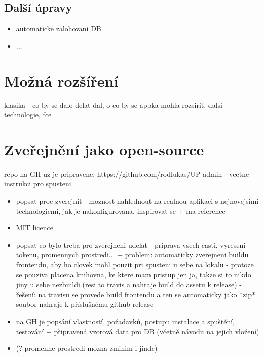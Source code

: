 \section{Další úpravy}
\begin{itemize}
\item automaticke zalohovani DB
\item ...
\end{itemize}



\chapter{Možná rozšíření}
klasika - co by se dalo delat dal, o co by se appka mohla rozsirit, dalsi technologie, fce

\chapter{Zveřejnění jako open-source}
repo na GH uz je pripravene: https://github.com/rodlukas/UP-admin - vcetne instrukci pro spusteni
\begin{itemize}
\item popsat proc zverejnit - moznost nahlednout na realnou aplikaci s nejnovejsimi technologiemi, jak je nakonfigurovana, inspirovat se + ma reference
\item MIT licence
\item popsat co bylo treba pro zverejneni udelat - priprava vsech casti, vyreseni tokenu, promennych prostredi... + problem: automaticky zverejneni buildu frontendu, aby ho clovek mohl pouzit pri spusteni u sebe na lokalu - protoze se pouziva placena knihovna, ke ktere mam pristup jen ja, takze si to nikdo jiny u sebe nezbuildi (resi to travis a nahraje build do assetu k release) - řešení: na travisu se provede build frontendu a ten se automaticky jako *zip* soubor nahraje k příslušnému github release 
\item na GH  je popsání vlastností, požadavků, postupu instalace a spuštění, testování + připravená vzorová data pro DB (včetně návodu na jejich vložení)
\item (? promenne prostredi mozna zminim i jinde)
\end{itemize}



